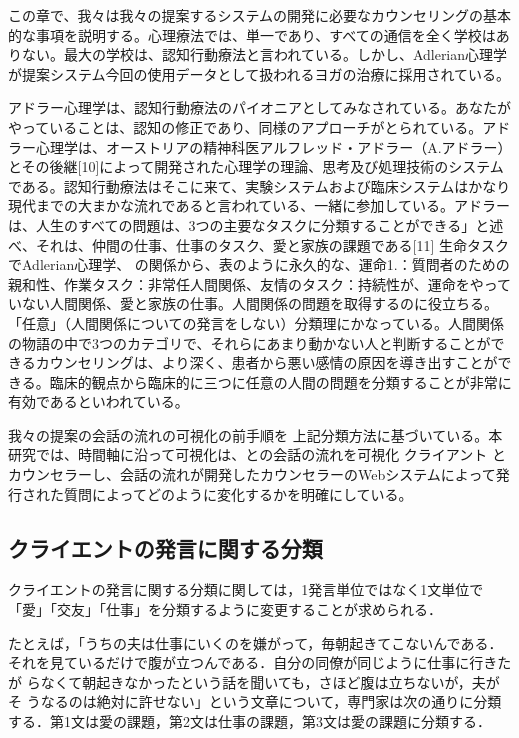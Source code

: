 \documentclass[shuuron]{kuee}
\begin{document}

 この章で、我々は我々の提案するシステムの開発に必要なカウンセリングの基本的な事項を説明する。心理療法では、単一であり、すべての通信を全く学校はありない。最大の学校は、認知行動療法と言われている。しかし、Adlerian心理学が提案システム今回の使用データとして扱われるヨガの治療に採用されている。

アドラー心理学は、認知行動療法のパイオニアとしてみなされている。あなたがやっていることは、認知の修正であり、同様のアプローチがとられている。アドラー心理学は、オーストリアの精神科医アルフレッド・アドラー（A.アドラー）とその後継[10]によって開発された心理学の理論、思考及び処理技術のシステムである。認知行動療法はそこに来て、実験システムおよび臨床システムはかなり現代までの大まかな流れであると言われている、一緒に参加している。アドラーは、人生のすべての問題は、3つの主要なタスクに分類することができる」と述べ、それは、仲間の仕事、仕事のタスク、愛と家族の課題である[11] 生命タスクでAdlerian心理学、 の関係から、表のように永久的な、運命1.：質問者のための親和性、作業タスク：非常任人間関係、友情のタスク：持続性が、運命をやっていない人間関係、愛と家族の仕事。人間関係の問題を取得するのに役立ちる。「任意」（人間関係についての発言をしない）分類理にかなっている。人間関係の物語の中で3つのカテゴリで、それらにあまり動かない人と判断することができるカウンセリングは、より深く、患者から悪い感情の原因を導き出すことができる。臨床的観点から臨床的に三つに任意の人間の問題を分類することが非常に有効であるといわれている。

我々の提案の会話の流れの可視化の前手順を 上記分類方法に基づいている。本研究では、時間軸に沿って可視化は、との会話の流れを可視化 クライアント とカウンセラーし、会話の流れが開発したカウンセラーのWebシステムによって発行された質問によってどのように変化するかを明確にしている。


\subsection{クライエントの発言に関する分類}



クライエントの発言に関する分類に関しては，1発言単位ではなく1文単位で「愛」「交友」「仕事」を分類するように変更することが求められる．

たとえば，「うちの夫は仕事にいくのを嫌がって，毎朝起きてこないんである．
それを見ているだけで腹が立つんである．自分の同僚が同じように仕事に行きたが
らなくて朝起きなかったという話を聞いても，さほど腹は立ちないが，夫がそ
うなるのは絶対に許せない」という文章について，専門家は次の通りに分類する．第1文は愛の課題，第2文は仕事の課題，第3文は愛の課題に分類する．
\end{document}
